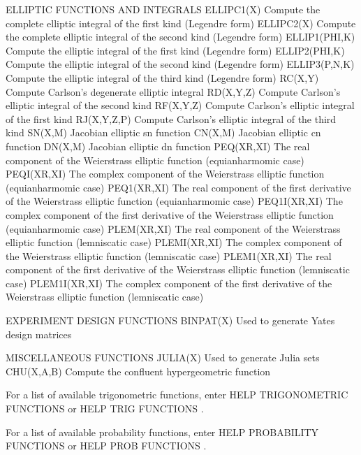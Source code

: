 ELLIPTIC FUNCTIONS AND INTEGRALS
   ELLIPC1(X)     Compute the complete elliptic integral of the first
                  kind (Legendre form)
   ELLIPC2(X)     Compute the complete elliptic integral of the second
                  kind (Legendre form)
   ELLIP1(PHI,K)  Compute the elliptic integral of the first kind
                  (Legendre form)
   ELLIP2(PHI,K)  Compute the elliptic integral of the second kind
                  (Legendre form)
   ELLIP3(P,N,K)  Compute the elliptic integral of the third kind
                  (Legendre form)
   RC(X,Y)        Compute Carlson's degenerate elliptic integral
   RD(X,Y,Z)      Compute Carlson's elliptic integral of the second
                  kind
   RF(X,Y,Z)      Compute Carlson's elliptic integral of the first
                  kind
   RJ(X,Y,Z,P)    Compute Carlson's elliptic integral of the third
                  kind
   SN(X,M)        Jacobian elliptic sn function
   CN(X,M)        Jacobian elliptic cn function
   DN(X,M)        Jacobian elliptic dn function
   PEQ(XR,XI)     The real component of the Weierstrass elliptic
                  function (equianharmomic case)
   PEQI(XR,XI)    The complex component of the Weierstrass elliptic
                  function (equianharmomic case)
   PEQ1(XR,XI)    The real component of the first derivative of the
                  Weierstrass elliptic function (equianharmomic case)
   PEQ1I(XR,XI)   The complex component of the first derivative of the
                  Weierstrass elliptic function (equianharmomic case)
   PLEM(XR,XI)    The real component of the Weierstrass elliptic
                  function (lemniscatic case)
   PLEMI(XR,XI)   The complex component of the Weierstrass elliptic
                  function (lemniscatic case)
   PLEM1(XR,XI)   The real component of the first derivative of the
                  Weierstrass elliptic function (lemniscatic case)
   PLEM1I(XR,XI)  The complex component of the first derivative of the
                  Weierstrass elliptic function (lemniscatic case)
 
 
EXPERIMENT DESIGN FUNCTIONS
   BINPAT(X)      Used to generate Yates design matrices
 
MISCELLANEOUS FUNCTIONS
   JULIA(X)       Used to generate Julia sets
   CHU(X,A,B)     Compute the confluent hypergeometric function
 
For a list of available trigonometric functions, enter HELP
TRIGONOMETRIC FUNCTIONS or HELP TRIG FUNCTIONS   .
 
For a list of available probability functions, enter HELP PROBABILITY
FUNCTIONS or HELP PROB FUNCTIONS   .
 
